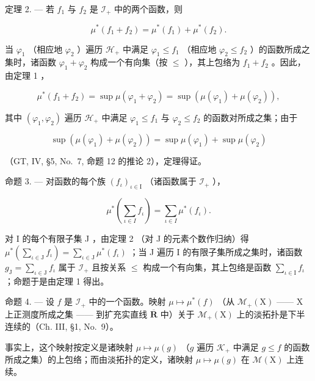 定理 2. --- 若 \(f_1\) 与 \(f_2\) 是 \(\mathcal{I}_+\) 中的两个函数，则

\[
\mu^ {*} (f _ {1} + f _ {2}) = \mu^ {*} (f _ {1}) + \mu^ {*} (f _ {2}).\tag{3}
\]

当 \(\varphi_{1}\) （相应地 \(\varphi_{2}\) ）遍历 \(\mathcal{H}_{+}\) 中满足 \(\varphi_{1} \leqslant f_{1}\) （相应地 \(\varphi_{2} \leqslant f_{2}\) ）的函数所成之集时，诸函数 \(\varphi_{1} + \varphi_{2}\) 构成一个有向集（按 \(\leqslant\) ），其上包络为 \(f_{1} + f_{2}\) 。因此，由定理 1 ，

\[
\mu^ {*} (f _ {1} + f _ {2}) = \sup \mu (\varphi_ {1} + \varphi_ {2}) = \sup \left(\mu (\varphi_ {1}) + \mu (\varphi_ {2})\right),
\]

其中 \((\varphi_{1},\varphi_{2})\) 遍历 \(\mathcal{H}_{+}\) 中满足 \(\varphi_1\leqslant f_1\) 与 \(\varphi_{2}\leqslant f_{2}\) 的函数对所成之集；由于

\[
\sup \left(\mu (\varphi_ {1}) + \mu (\varphi_ {2})\right) = \sup \mu (\varphi_ {1}) + \sup \mu (\varphi_ {2})
\]

（GT, IV, §5, No.~7, 命题 12 的推论 2），定理得证。

命题 3. --- 对函数的每个族 \((f_{\iota})_{\iota \in \mathrm{I}}\) （诸函数属于 \(\mathcal{I}_{+}\) ），

\[
\mu^ {*} \left(\sum_ {\iota \in I} f _ {\iota}\right) = \sum_ {\iota \in I} \mu^ {*} (f _ {\iota}).\tag{4}
\]

对 I 的每个有限子集 J ，由定理 2 （对 J 的元素个数作归纳）得 \(\mu^{*}\left(\sum_{\iota \in \mathrm{J}}f_{\iota}\right) = \sum_{\iota \in \mathrm{J}}\mu^{*}(f_{\iota})\) ；当 J 遍历 I 的有限子集所成之集时，诸函数 \(g_{\mathrm{J}} = \sum_{\iota \in \mathrm{J}}f_{\iota}\) 属于 \(\mathcal{I}_{+}\) 且按关系 \(\leqslant\) 构成一个有向集，其上包络是函数 \(\sum_{\iota \in \mathrm{I}}f_{\iota}\) ；命题于是由定理 1 得出。

命题 4. --- 设 \(f\) 是 \(\mathcal{I}_{+}\) 中的一个函数。映射 \(\mu \mapsto \mu^{*}(f)\) （从 \(\mathcal{M}_{+}(\mathrm{X})\) —— \(\mathrm{X}\) 上正测度所成之集 —— 到扩充实直线 \(\overline{\mathbf{R}}\) 中）关于 \(\mathcal{M}_{+}(\mathrm{X})\) 上的淡拓扑是下半连续的（Ch. III, §1, No.~9）。

事实上，这个映射按定义是诸映射 \(\mu \mapsto \mu(g)\) （\(g\) 遍历 \(\mathcal{K}_{+}\) 中满足 \(g \leqslant f\) 的函数所成之集）的上包络；而由淡拓扑的定义，诸映射 \(\mu \mapsto \mu(g)\) 在 \(\mathcal{M}(\mathrm{X})\) 上连续。

